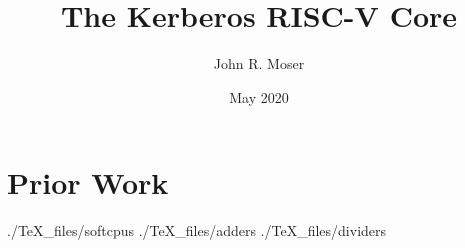 \documentclass[a4paper,12pt]{book}
\begin{document}
\author{John R. Moser}
\title{The Kerberos RISC-V Core}
\date{May 2020}

\frontmatter
\maketitle

\cleardoublepage
\tableofcontents

\mainmatter
\part{Prior Work}
 {./TeX_files/softcpus}
 {./TeX_files/adders}
 {./TeX_files/dividers}

\backmatter
\end{document}
